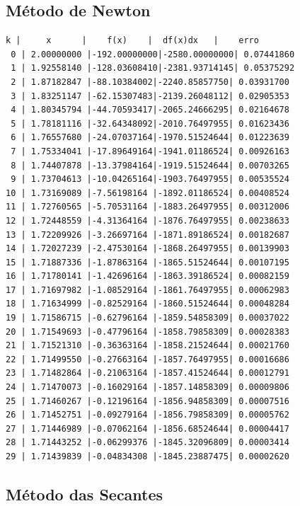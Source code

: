 \documentclass{article}
\begin{document}
\subsection{Método de Newton}
\begin{verbatim}
k |     x      |    f(x)    |  df(x)dx   |    erro    
 0 | 2.00000000 |-192.00000000|-2580.00000000| 0.07441860 
 1 | 1.92558140 |-128.03608410|-2381.93714145| 0.05375292 
 2 | 1.87182847 |-88.10384002|-2240.85857750| 0.03931700 
 3 | 1.83251147 |-62.15307483|-2139.26048112| 0.02905353 
 4 | 1.80345794 |-44.70593417|-2065.24666295| 0.02164678 
 5 | 1.78181116 |-32.64348092|-2010.76497955| 0.01623436 
 6 | 1.76557680 |-24.07037164|-1970.51524644| 0.01223639 
 7 | 1.75334041 |-17.89649164|-1941.01186524| 0.00926163 
 8 | 1.74407878 |-13.37984164|-1919.51524644| 0.00703265 
 9 | 1.73704613 |-10.04265164|-1903.76497955| 0.00535524 
10 | 1.73169089 |-7.56198164 |-1892.01186524| 0.00408524 
11 | 1.72760565 |-5.70531164 |-1883.26497955| 0.00312006 
12 | 1.72448559 |-4.31364164 |-1876.76497955| 0.00238633 
13 | 1.72209926 |-3.26697164 |-1871.89186524| 0.00182687 
14 | 1.72027239 |-2.47530164 |-1868.26497955| 0.00139903 
15 | 1.71887336 |-1.87863164 |-1865.51524644| 0.00107195 
16 | 1.71780141 |-1.42696164 |-1863.39186524| 0.00082159 
17 | 1.71697982 |-1.08529164 |-1861.76497955| 0.00062983 
18 | 1.71634999 |-0.82529164 |-1860.51524644| 0.00048284 
19 | 1.71586715 |-0.62796164 |-1859.54858309| 0.00037022 
20 | 1.71549693 |-0.47796164 |-1858.79858309| 0.00028383 
21 | 1.71521310 |-0.36363164 |-1858.21524644| 0.00021760 
22 | 1.71499550 |-0.27663164 |-1857.76497955| 0.00016686 
23 | 1.71482864 |-0.21063164 |-1857.41524644| 0.00012791 
24 | 1.71470073 |-0.16029164 |-1857.14858309| 0.00009806 
25 | 1.71460267 |-0.12196164 |-1856.94858309| 0.00007516 
26 | 1.71452751 |-0.09279164 |-1856.79858309| 0.00005762 
27 | 1.71446989 |-0.07062164 |-1856.68524644| 0.00004417 
28 | 1.71443252 |-0.06299376 |-1845.32096809| 0.00003414 
29 | 1.71439839 |-0.04834308 |-1845.23887475| 0.00002620 
\end{verbatim}

\subsection{Método das Secantes}
\end{document}
